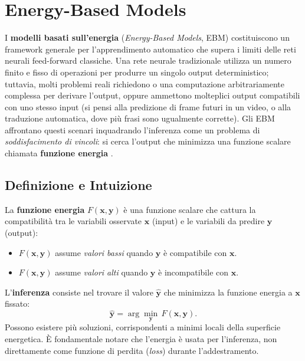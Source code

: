 \chapter{Energy-Based Models}
\label{ch:ebm}

I \textbf{modelli basati sull'energia} (\emph{Energy-Based Models}, EBM)
costituiscono un framework generale per l'apprendimento automatico che
supera i limiti delle reti neurali feed-forward classiche. Una rete
neurale tradizionale utilizza un numero finito e fisso di operazioni per
produrre un singolo output deterministico; tuttavia, molti problemi reali
richiedono o una computazione arbitrariamente complessa per derivare
l'output, oppure ammettono molteplici output compatibili con uno stesso
input (si pensi alla predizione di frame futuri in un video, o alla
traduzione automatica, dove più frasi sono ugualmente corrette). Gli EBM
affrontano questi scenari inquadrando l'inferenza come un problema di
\emph{soddisfacimento di vincoli}: si cerca l'output che minimizza una
funzione scalare chiamata \textbf{funzione energia} \citep{lecun2006tutorial,bishop2024}.

\section{Definizione e Intuizione}
\label{sec:ebm-definition}

La \textbf{funzione energia} $F(\mathbf{x}, \mathbf{y})$ è una funzione
scalare che cattura la compatibilità tra le variabili osservate
$\mathbf{x}$ (input) e le variabili da predire $\mathbf{y}$ (output):

\begin{itemize}
  \item $F(\mathbf{x}, \mathbf{y})$ assume \emph{valori bassi} quando
        $\mathbf{y}$ è compatibile con $\mathbf{x}$.
  \item $F(\mathbf{x}, \mathbf{y})$ assume \emph{valori alti} quando
        $\mathbf{y}$ è incompatibile con $\mathbf{x}$.
\end{itemize}

L'\textbf{inferenza} consiste nel trovare il valore $\hat{\mathbf{y}}$
che minimizza la funzione energia a $\mathbf{x}$ fissato:
\begin{equation}
  \hat{\mathbf{y}} = \arg\min_{\mathbf{y}}\, F(\mathbf{x}, \mathbf{y}).
  \label{eq:ebm-inference}
\end{equation}
Possono esistere più soluzioni, corrispondenti a minimi locali della
superficie energetica. È fondamentale notare che l'energia è usata
per l'inferenza, non direttamente come funzione di perdita
(\emph{loss}) durante l'addestramento.

